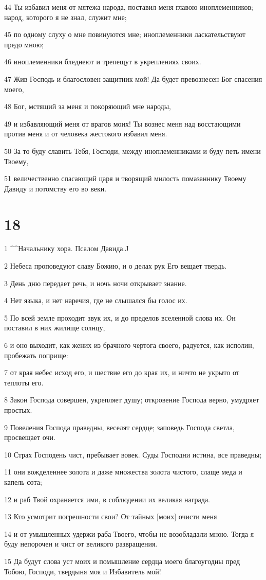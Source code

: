 \par 44 Ты избавил меня от мятежа народа, поставил меня главою иноплеменников; народ, которого я не знал, служит мне;
\par 45 по одному слуху о мне повинуются мне; иноплеменники ласкательствуют предо мною;
\par 46 иноплеменники бледнеют и трепещут в укреплениях своих.
\par 47 Жив Господь и благословен защитник мой! Да будет превознесен Бог спасения моего,
\par 48 Бог, мстящий за меня и покоряющий мне народы,
\par 49 и избавляющий меня от врагов моих! Ты вознес меня над восстающими против меня и от человека жестокого избавил меня.
\par 50 За то буду славить Тебя, Господи, между иноплеменниками и буду петь имени Твоему,
\par 51 величественно спасающий царя и творящий милость помазаннику Твоему Давиду и потомству его во веки.

\chapter{18}

\par 1 ^^Начальнику хора. Псалом Давида.^^
\par 2 Небеса проповедуют славу Божию, и о делах рук Его вещает твердь.
\par 3 День дню передает речь, и ночь ночи открывает знание.
\par 4 Нет языка, и нет наречия, где не слышался бы голос их.
\par 5 По всей земле проходит звук их, и до пределов вселенной слова их. Он поставил в них жилище солнцу,
\par 6 и оно выходит, как жених из брачного чертога своего, радуется, как исполин, пробежать поприще:
\par 7 от края небес исход его, и шествие его до края их, и ничто не укрыто от теплоты его.
\par 8 Закон Господа совершен, укрепляет душу; откровение Господа верно, умудряет простых.
\par 9 Повеления Господа праведны, веселят сердце; заповедь Господа светла, просвещает очи.
\par 10 Страх Господень чист, пребывает вовек. Суды Господни истина, все праведны;
\par 11 они вожделеннее золота и даже множества золота чистого, слаще меда и капель сота;
\par 12 и раб Твой охраняется ими, в соблюдении их великая награда.
\par 13 Кто усмотрит погрешности свои? От тайных [моих] очисти меня
\par 14 и от умышленных удержи раба Твоего, чтобы не возобладали мною. Тогда я буду непорочен и чист от великого развращения.
\par 15 Да будут слова уст моих и помышление сердца моего благоугодны пред Тобою, Господи, твердыня моя и Избавитель мой!

